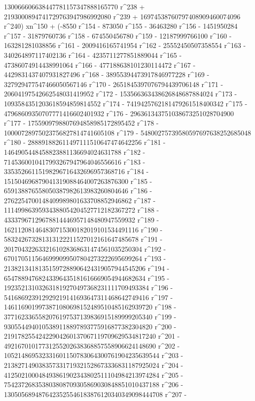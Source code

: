        130066606638447781157347888165770 r^238 + 
       2193000894741729763947986992080 r^239 + 
       16974538760797408909460074096 r^240) xn^150 + (-8550 r^154 - 
       873050 r^155 - 36463280 r^156 - 1451950284 r^157 - 
       31879760736 r^158 - 674550456780 r^159 - 
       12187999766100 r^160 - 163281281038856 r^161 - 
       2009416165741954 r^162 - 25552450507358554 r^163 - 
       340264897117402136 r^164 - 4235711277851889044 r^165 - 
       47386074914438991064 r^166 - 477188638101230114472 r^167 - 
       4429831437407931827496 r^168 - 38955394473917846977228 r^169 - 
       327929477547466050567146 r^170 - 
       2651845397076794439706148 r^171 - 
       20604197542662548031419952 r^172 - 
       153566363438626848687884024 r^173 - 
       1093584351203618594859814552 r^174 - 
       7419425762181479261518400342 r^175 - 
       47968609350707771416602401932 r^176 - 
       296361343751038673251028704900 r^177 - 
       1755909798807694858985172895452 r^178 - 
       10000728975023756827814741605108 r^179 - 
       54800275739580597697638252685048 r^180 - 
       288891882611497111510647474642256 r^181 - 
       1464905448458823881136694024631788 r^182 - 
       7145360010417993267947964046556616 r^183 - 
       33535266115198296716432696957368716 r^184 - 
       151504696879041319088464007263876300 r^185 - 
       659138876558050387982613983260804646 r^186 - 
       2762254700148409989801633708852946862 r^187 - 
       11149986395934388054204527712182367272 r^188 - 
       43337967129678814446957148480947559932 r^189 - 
       162112081464830715300182019101534491116 r^190 - 
       583242673281313122211527012161647485678 r^191 - 
       2017043226332161028368631474561035250304 r^192 - 
       6701705115646999099507804273222695699264 r^193 - 
       21382134181351597288906424319057944545206 r^194 - 
       65478894768243396435181616669054944682634 r^195 - 
       192352131032631819270497368231111709493384 r^196 - 
       541686923912929219141693647311468642749416 r^197 - 
       1461169019973871080698152489510485162939720 r^198 - 
       3771623365582076197537139836915189999205340 r^199 - 
       9305544940105389118897893775916877382304820 r^200 - 
       21917825542422904260137067119709629534817240 r^201 - 
       49216701017731255202638368857558906624148690 r^202 - 
       105214869532331601150783064300761904235639544 r^203 - 
       213827149038357331719321528673336831187925024 r^204 - 
       412502100048493861902343802511104984213974284 r^205 - 
       754237268353803808709305869030848851010437188 r^206 - 
       1305056894876423525546183876120340349098444708 r^207 - 
